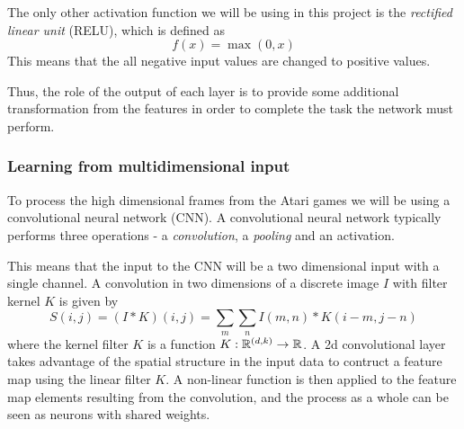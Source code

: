\documentclass[11pt]{article}
\begin{document}
The only other activation function we will be using in this project
is the \textit{rectified linear unit} (RELU), which is defined as
\begin{equation}
    f(x) = \max(0,x)
\end{equation}
This means that the all negative input values are changed to positive
values.

Thus, the role of the output of each layer is to provide some additional
transformation from the features in order to complete the task the network
must perform\cite{DeepLearningBook}.

\subsubsection{Learning from multidimensional input}

To process the high dimensional frames from the Atari games we will be using
a convolutional neural network (CNN).
A convolutional neural network typically performs three operations - a \textit{convolution},
a \textit{pooling} and an activation.

This means that the input to the CNN will be a two dimensional input with a single
channel. A convolution in two dimensions of a discrete image $I$ with filter kernel $K$
is given by 
\begin{equation}
    S(i, j) = (I \ast K)(i, j) = \sum\limits_m \sum\limits_n I(m, n) * K(i - m, j - n)
\end{equation}
where the kernel filter $K$ is a function $K : \mathbb{R}^{(d, k)} \to \mathbb{R}$.
A 2d convolutional layer takes advantage of the spatial structure in the input data to contruct a feature map
using the linear filter $K$.
A non-linear function is then applied to the feature map elements resulting from the convolution,
and the process as a whole can be seen as neurons with shared weights\cite{IgelConv}.
\end{document}
